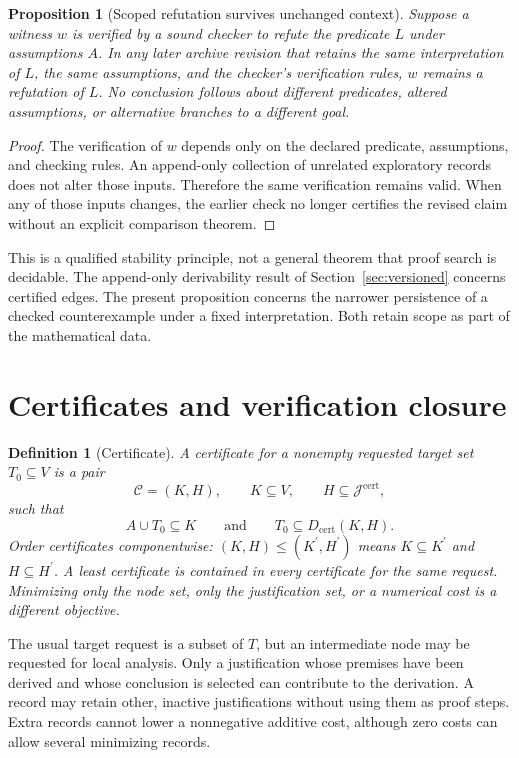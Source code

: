 \documentclass[11pt,oneside]{article}
\theoremstyle{komorebiplain}
\newtheorem{proposition}[theorem]{Proposition}
\theoremstyle{komorebidefinition}
\newtheorem{definition}[theorem]{Definition}
\theoremstyle{komorebiremark}
\newcommand{\Jcal}{\mathcal J}
\newcommand{\Ccal}{\mathcal C}
\begin{document}
\begin{proposition}[Scoped refutation survives unchanged context]
\label{res:22:3}
Suppose a witness $w$ is verified by a sound checker to refute the predicate $L$ under assumptions $A$. In any later archive revision that retains the same interpretation of $L$, the same assumptions, and the checker's verification rules, $w$ remains a refutation of $L$. No conclusion follows about different predicates, altered assumptions, or alternative branches to a different goal.
\end{proposition}
\begin{proof}
The verification of $w$ depends only on the declared predicate, assumptions, and checking rules. An append-only collection of unrelated exploratory records does not alter those inputs. Therefore the same verification remains valid. When any of those inputs changes, the earlier check no longer certifies the revised claim without an explicit comparison theorem.
\end{proof}

This is a qualified stability principle, not a general theorem that proof search is decidable. The append-only derivability result of Section~\ref{sec:versioned} concerns certified edges. The present proposition concerns the narrower persistence of a checked counterexample under a fixed interpretation. Both retain scope as part of the mathematical data.


\section{Certificates and verification closure}
\label{sec:old4}

\begin{definition}[Certificate]
\label{res:4:1}
A certificate for a nonempty requested target set $T_0\subseteq V$ is a pair
\[
\Ccal=(K,H),
\qquad K\subseteq V,
\qquad H\subseteq\Jcal^{\mathrm{cert}},
\]
such that
\[
A\cup T_0\subseteq K
\qquad\text{and}\qquad
T_0\subseteq D_{\mathrm{cert}}(K,H).
\]
Order certificates componentwise: $(K,H)\leq(K^{\prime},H^{\prime})$ means $K\subseteq K^{\prime}$ and $H\subseteq H^{\prime}$. A least certificate is contained in every certificate for the same request. Minimizing only the node set, only the justification set, or a numerical cost is a different objective.
\end{definition}

The usual target request is a subset of $T$, but an intermediate node may be requested for local analysis. Only a justification whose premises have been derived and whose conclusion is selected can contribute to the derivation. A record may retain other, inactive justifications without using them as proof steps. Extra records cannot lower a nonnegative additive cost, although zero costs can allow several minimizing records.
\end{document}
